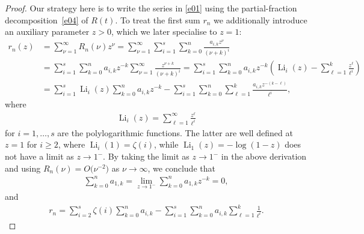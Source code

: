 \documentclass[pdftex]{sigma}
\newcommand{\Li}{\operatorname{Li}}
\begin{document}
\begin{proof}
Our strategy here is to write the series in \eqref{e01} using the partial-fraction decomposition~\eqref{e04} of $R(t)$. To treat the first sum $r_n$ we additionally introduce an auxiliary parameter $z>0$, which we later specialise to $z=1$:
\begin{align*}
r_n(z) &=\sum_{\nu=1}^\infty R_n(\nu)z^\nu
=\sum_{\nu=1}^\infty\sum_{i=1}^s\sum_{k=0}^n\frac{a_{i,k}z^\nu}{(\nu+k)^i}\\
&=\sum_{i=1}^s\sum_{k=0}^na_{i,k}z^{-k}\sum_{\nu=1}^\infty\frac{z^{\nu+k}}{(\nu+k)^i}
=\sum_{i=1}^s\sum_{k=0}^na_{i,k}z^{-k}\left(\Li_i(z)-\sum_{\ell=1}^k\frac{z^\ell}{\ell^i}\right)\\
&=\sum_{i=1}^s\Li_i(z)\sum_{k=0}^na_{i,k}z^{-k}-\sum_{i=1}^s\sum_{k=0}^n\sum_{\ell=1}^k\frac{a_{i,k}z^{-(k-\ell)}}{\ell^i},
\end{align*}
where
\begin{gather*}
\Li_i(z)=\sum_{\ell=1}^\infty\frac{z^\ell}{\ell^i}
\end{gather*}
for $i=1,\dots,s$ are the polylogarithmic functions. The latter are well defined at $z=1$ for $i\ge2$, where $\Li_i(1)=\zeta(i)$, while $\Li_1(z)=-\log(1-z)$ does not have a limit as $z\to1^-$. By taking the limit as $z\to1^-$ in the above derivation and using $R_n(\nu)=O\big(\nu^{-2}\big)$ as $\nu\to\infty$, we conclude that
\begin{gather*}
\sum_{k=0}^na_{1,k}=\lim_{z\to1^-}\sum_{k=0}^na_{1,k}z^{-k}=0,
\end{gather*}
and
\begin{gather}
r_n=\sum_{i=2}^s\zeta(i)\sum_{k=0}^na_{i,k}-\sum_{i=1}^s\sum_{k=0}^na_{i,k}\sum_{\ell=1}^k\frac1{\ell^i}.\label{e07}
\end{gather}


\end{proof}
\end{document}
